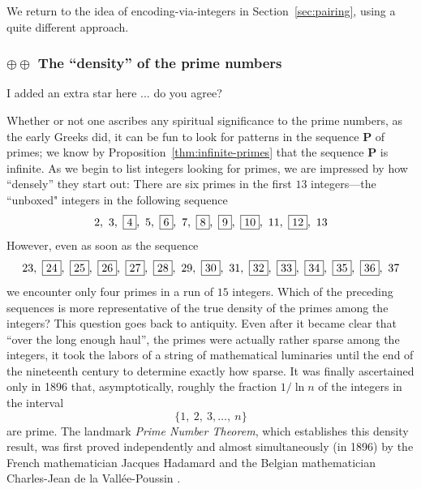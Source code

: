 \smallskip

We return to the idea of encoding-via-integers in Section~\ref{sec:pairing}, using a quite different approach.

\subsubsection{$\oplus \oplus$ The ``density'' of the prime numbers}
\label{sec:prime-density}

{\Arny I added an extra star here ... do you agree?}

Whether or not one ascribes any spiritual significance to the prime numbers, as the early Greeks did, it can be fun to look for patterns in the sequence {\bf P} of primes; we know by Proposition~\ref{thm:infinite-primes} that the sequence {\bf P} is infinite.  As we begin to list integers looking for primes, we are impressed by how ``densely'' they start out:  There are six primes in the first $13$ integers---the ``unboxed" integers in the following sequence
\[  2, \ 3, \ \fbox{4}, \ 5, \ \fbox{6}, \ 7, \ \fbox{8}, \ \fbox{9}, \ \fbox{10}, \ 11, \ \fbox{12}, \ 13  \] 
However, even as soon as the sequence
\[ 23, \ \fbox{24}, \ \fbox{25}, \ \fbox{26}, \ \fbox{27}, \ \fbox{28}, \ 29, \ \fbox{30}, \ 31, 
\ \fbox{32}, \ \fbox{33}, \ \fbox{34}, \ \fbox{35}, \ \fbox{36}, \ 37
\]
we encounter only four primes in a run of $15$ integers.  Which of the preceding sequences is more representative of the true density of the primes among the integers?  This question goes back to antiquity.  Even after it became clear that ``over the long enough haul'', the primes were actually rather sparse among the integers, it took the labors of a string of mathematical luminaries until the  end of the nineteenth century to determine exactly how sparse.  It was finally ascertained only in 1896 that, asymptotically, roughly the fraction $1/ \ln n$ of the integers in the interval
\[ \{ 1, \ 2, \ 3, \ldots, \ n \} \]
are prime.  The landmark {\it Prime Number Theorem}, which establishes this density result, was first proved independently and almost simultaneously (in 1896) by the French mathematician Jacques Hadamard  \cite{Hadamard} and the Belgian mathematician Charles-Jean de la 
Vall\'{e}e-Poussin \cite{Poussin}.
 

\smallskip

